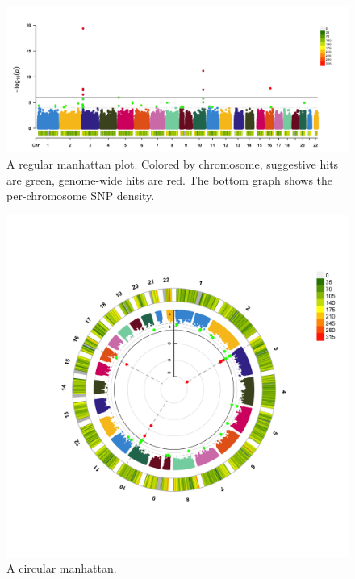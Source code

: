 \documentclass[
]{book}
\begin{document}
\begin{figure}[H]

{\centering \includegraphics[width=58.33in]{img/_gwas_dummy/show-cmplot-all-manhattan} 

}

\caption{A regular manhattan plot. Colored by chromosome, suggestive hits are green, genome-wide hits are red. The bottom graph shows the per-chromosome SNP density.}\label{fig:show-cmplot-all-manhattan}
\end{figure}

\begin{figure}[H]

{\centering \includegraphics[width=41.67in]{img/_gwas_dummy/show-cmplot-all-circular} 

}

\caption{A circular manhattan.}\label{fig:show-cmplot-all-circular}
\end{figure}
\end{document}
